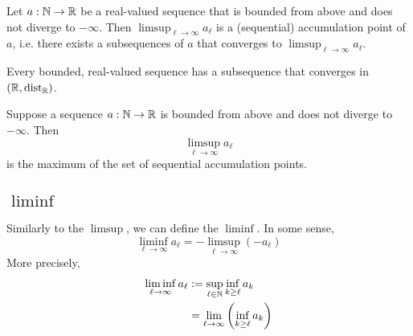 \begin{theorem}
    Let $a: \mathbb{N} \to \mathbb{R}$ be a real-valued sequence that is bounded from above and does not diverge to $-\infty$. Then
    $\limsup_{\ell \to \infty}a_\ell$ is a (sequential) accumulation point of $a$, i.e. there exists a subsequences of $a$ that converges to $\limsup_{\ell \to \infty}a_\ell$.
\end{theorem}

\begin{corollary}
    Every bounded, real-valued sequence has a subsequence that converges in $(\mathbb{R}, \text{dist}_{\mathbb{R}})$.
\end{corollary}

\begin{theorem}
    Suppose a sequence $a: \mathbb{N} \to \mathbb{R}$ is bounded from above and does not diverge to $-\infty$. Then
    $$\limsup_{\ell\to\infty}a_\ell$$
    is the maximum of the set of sequential accumulation points.
\end{theorem}

\subsection{$\liminf$}
Similarly to the $\limsup$, we can define the $\liminf$. In some sense,
$$\liminf_{\ell\to\infty}a_\ell = -\limsup_{\ell\to\infty}(-a_\ell)$$
More precisely, 
\begin{align*}
    \liminf_{\ell\to\infty}a_\ell &:= \sup_{\ell\in\mathbb{N}}\inf_{k \ge \ell}a_k\\
                                  &=\lim_{\ell\to\infty}\left(\inf_{k\ge\ell}a_k\right)
\end{align*}

